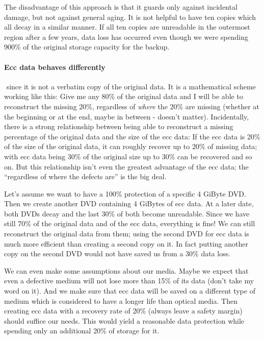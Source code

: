 \smallskip

The disadvantage of this approach is that it guards only against
incidental damage, but not against general aging. It is not helpful
to have ten copies which all decay in a similar manner. If all 
ten copies are unreadable in the outermost region after a few years,
data loss has occurred even though we were spending 900\% of the
original storage capacity for the backup.

\paragraph{Ecc data behaves differently}$\!\!\!\!\!$ since it is not a verbatim
copy of the original data. It is a mathematical scheme working like
this: Give me any 80\% of the original data and I will be able to
reconstruct the missing 20\%, regardless of {\em where} the 20\%
are missing (whether at the beginning or at the end, maybe in between - doesn't
matter). Incidentally, there is a strong relationship between 
being able to reconstruct a missing percentage of the original data 
and the size of the ecc data: If the ecc data is 20\% of the size of
the original data, it can roughly recover up to 20\% of missing data;
with ecc data being 30\% of the original size up to 30\% can be recovered
and so on. But this relationship isn't even the greatest advantage
of the ecc data; the ``regardless of where the defects are'' is the big deal.

\smallskip

Let's assume we want to have a 100\% protection of a specific 4 GiByte 
DVD. Then we create another DVD containing 4 GiBytes of ecc data. 
At a later date, both DVDs decay and the last 30\% of both become
unreadable. Since we have still 70\% of the original data and of the
ecc data, everything is fine! We can still reconstruct the original 
data from them; using the second DVD for ecc data is much more
efficient than creating a second copy on it. In fact putting another
copy on the second DVD would not have saved us from a 30\% data loss.

\smallskip

We can even make some assumptions about our media. Maybe we expect
that even a defective medium will not lose more than 15\% of its data 
(don't take my word on it). And we make sure that ecc data will be saved
on a different type of medium which is considered to have a longer life than optical
media. Then creating ecc data with a recovery rate of 20\% (always
leave a safety margin) should suffice our needs. 
This would yield a reasonable data protection
while spending only an additional 20\% of storage for it. 

